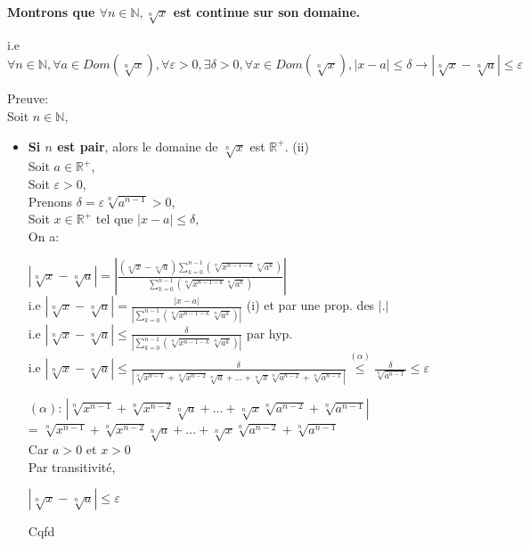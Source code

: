 \documentclass[a4paper,11pt]{report}
\begin{document}
\textbf{Montrons que $\forall n \in \mathbb{N}, \sqrt[n\,]{x}$ est continue sur son domaine.}
\begin{center}
i.e $\forall n \in \mathbb{N}, \forall a \in Dom(\sqrt[n\,]{x}), \forall \varepsilon > 0, \exists \delta > 0, \forall x \in Dom(\sqrt[n\,]{x}), |x-a| \le \delta \rightarrow |\sqrt[n\,]{x}-\sqrt[n\,]{a}| \le \varepsilon$
\end{center}
Preuve:\\
Soit $n \in \mathbb{N}$,
\begin{itemize}
	\item \textbf{Si $n$ est pair}, alors le domaine de $\sqrt[n\,]{x}$ est $\mathbb{R}^+$. (ii)\\
	Soit $a \in \mathbb{R}^+$,\\
	Soit $\varepsilon > 0$,\\
	Prenons $\delta = \varepsilon \sqrt[n\,]{a^{n-1}} > 0$,\\
	Soit $x \in \mathbb{R}^+$ tel que $|x-a| \le \delta$,\\
	On a:\\
	\begin{center}
		$|\sqrt[n\,]{x}-\sqrt[n\,]{a}| = |\frac{(\sqrt[n\,]{x}-\sqrt[n\,]{a})\sum\limits_{k=0}^{n-1}{(\sqrt[n\,]{x^{n-1-k}}\sqrt[n\,]{a^k})}}{\sum\limits_{k=0}^{n-1}{(\sqrt[n\,]{x^{n-1-k}}\sqrt[n\,]{a^k})}}|$\\
		
		i.e $|\sqrt[n\,]{x}-\sqrt[n\,]{a}| = \frac{|x-a|}{|\sum\limits_{k=0}^{n-1}{(\sqrt[n\,]{x^{n-1-k}}\sqrt[n\,]{a^k})}|}$ (i) et par une prop. des $|.|$\\
		
		i.e $|\sqrt[n\,]{x}-\sqrt[n\,]{a}| \le \frac{\delta}{|\sum\limits_{k=0}^{n-1}{(\sqrt[n\,]{x^{n-1-k}}\sqrt[n\,]{a^k})}|}$ par hyp.\\
		
		i.e $|\sqrt[n\,]{x}-\sqrt[n\,]{a}| \le \frac{\delta}{|\sqrt[n\,]{x^{n-1}}+\sqrt[n\,]{x^{n-2}}\sqrt[n\,]{a}+...+\sqrt[n\,]{x}\sqrt[n\,]{a^{n-2}}+\sqrt[n\,]{a^{n-1}}|} \stackrel{(\alpha)}{\le}  \frac{\delta}{\sqrt[n\,]{a^{n-1}}} \le \varepsilon$\\		
	\end{center}
	$(\alpha)$: $|\sqrt[n\,]{x^{n-1}}+\sqrt[n\,]{x^{n-2}}\sqrt[n\,]{a}+...+\sqrt[n\,]{x}\sqrt[n\,]{a^{n-2}}+\sqrt[n\,]{a^{n-1}}|$\\
	= $\sqrt[n\,]{x^{n-1}}+\sqrt[n\,]{x^{n-2}}\sqrt[n\,]{a}+...+\sqrt[n\,]{x}\sqrt[n\,]{a^{n-2}}+\sqrt[n\,]{a^{n-1}}$\\ Car $a>0$ et $x>0$\\
	Par transitivité,\\
	\begin{center}
		$|\sqrt[n\,]{x}-\sqrt[n\,]{a}| \le \varepsilon$\\
	\end{center}
	Cqfd\\
	

\end{itemize}
\end{document}
